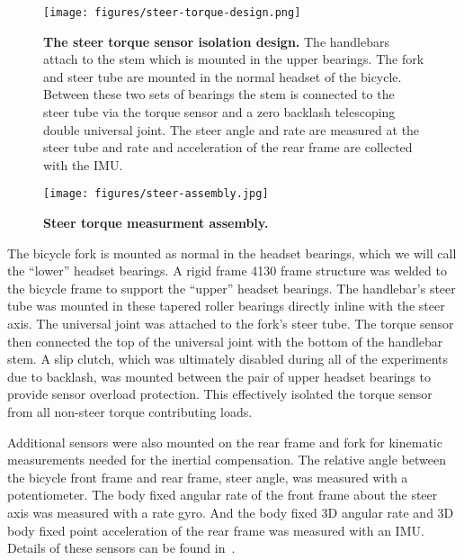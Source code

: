 \documentclass[10pt]{article}
\begin{document}
\begin{figure}
  \centering
  \texttt{[image: figures/steer-torque-design.png]}
  \caption{{\bf The steer torque sensor isolation design.} The handlebars attach to
    the stem which is mounted in the upper bearings. The fork and steer tube
    are mounted in the normal headset of the bicycle. Between these two sets of
    bearings the stem is connected to the steer tube via the torque sensor and a
    zero backlash telescoping double universal joint. The steer angle and rate
    are measured at the steer tube and rate and acceleration of the rear frame
    are collected with the IMU.}
  \label{fig:steer-torque-design}
\end{figure}

\begin{figure}
  \centering
  \texttt{[image: figures/steer-assembly.jpg]}
  \caption{{\bf Steer torque measurment assembly.} }
  \label{fig:steer-torque-design}
\end{figure}

The bicycle fork is mounted as normal in the headset bearings, which we will
call the ``lower'' headset bearings. A rigid frame 4130 frame structure was
welded to the bicycle frame to support the ``upper'' headset bearings. The
handlebar's steer tube was mounted in these tapered roller bearings directly
inline with the steer axis. The universal joint was attached to the fork's
steer tube. The torque sensor then connected the top of the universal joint
with the bottom of the handlebar stem. A slip clutch, which was ultimately
disabled during all of the experiments due to backlash, was mounted between the
pair of upper headset bearings to provide sensor overload protection. This
effectively isolated the torque sensor from all non-steer torque contributing
loads.

Additional sensors were also mounted on the rear frame and fork for kinematic
measurements needed for the inertial compensation. The relative angle between
the bicycle front frame and rear frame, steer angle, was measured with a
potentiometer. The body fixed angular rate of the front frame about the steer
axis was measured with a rate gyro. And the body fixed 3D angular rate and 3D
body fixed point acceleration of the rear frame was measured with an IMU.
Details of these sensors can be found in~\cite{Moore2012}.

\end{document}
